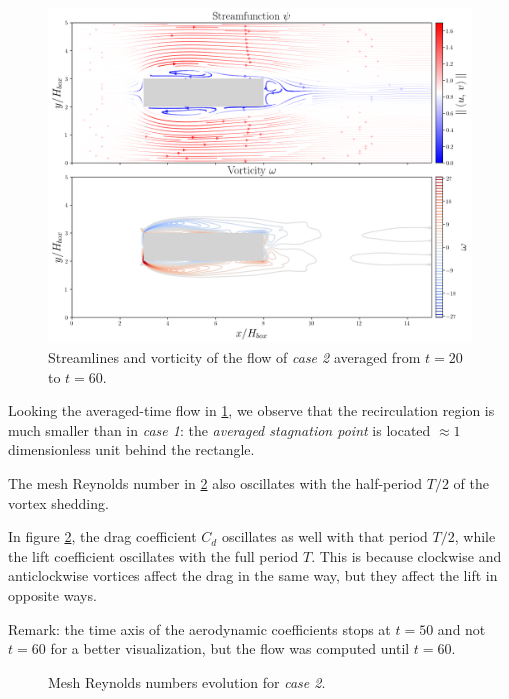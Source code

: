 \documentclass[11 pt]{article}
\begin{document}
\begin{figure}[H]
    \centering
    \includegraphics[width=\textwidth]{../figures/avg_flow_case_2.png}
    \caption{Streamlines and vorticity of the flow of \textit{case 2} averaged from $t=20$ to $t=60$.}
    \label{fig:averaging_2}
\end{figure}

Looking the averaged-time flow in \ref{fig:averaging_2}, we observe that the recirculation region is much smaller than in \textit{case 1}: the \textit{averaged stagnation point} is located $\approx 1$ dimensionless unit behind the rectangle.

The mesh Reynolds number in \ref{fig:mesh_re_case2} also oscillates with the half-period $T/2$ of the vortex shedding.

In figure \ref{fig:mesh_re_case2}, the drag coefficient $C_d$ oscillates as well with that period $T/2$, while the lift coefficient oscillates with the full period $T$. This is because clockwise and anticlockwise vortices affect the drag in the same way, but they affect the lift in opposite ways.

Remark: the time axis of the aerodynamic coefficients stops at $t=50$ and not $t=60$ for a better visualization, but the flow was computed until $t=60$.

\begin{figure}[H]
    \centering
    
    \caption{Mesh Reynolds numbers evolution for \textit{case 2}.}
    \label{fig:mesh_re_case2}
\end{figure}
\end{document}
